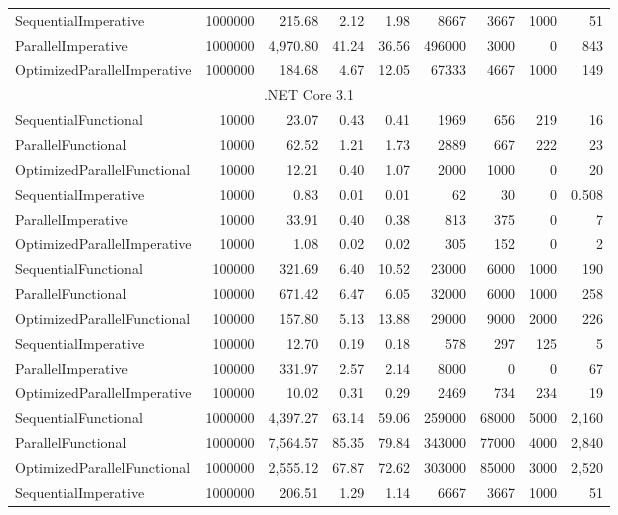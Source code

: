 \begin{table}
\begin{tabularx}{\linewidth}{Xrrrrrrrr}
SequentialImperative	&	1000000	&	215.68	&	2.12	&	1.98	&	8667	&	3667	&	1000	&	51	\\
ParallelImperative	&	1000000	&	4,970.80	&	41.24	&	36.56	&	496000	&	3000	&	0	&	843	\\
OptimizedParallelImperative	&	1000000	&	184.68	&	4.67	&	12.05	&	67333	&	4667	&	1000	&	149	\\
      \midrule
			\multicolumn{9}{c}{.NET Core 3.1} \\ 
			\midrule 
SequentialFunctional	&	10000	&	23.07	&	0.43	&	0.41	&	1969	&	656	&	219	&	16	\\
ParallelFunctional	&	10000	&	62.52	&	1.21	&	1.73	&	2889	&	667	&	222	&	23	\\
OptimizedParallelFunctional	&	10000	&	12.21	&	0.40	&	1.07	&	2000	&	1000	&	0	&	20	\\
SequentialImperative	&	10000	&	0.83	&	0.01	&	0.01	&	62	&	30	&	0	&	0.508	\\
ParallelImperative	&	10000	&	33.91	&	0.40	&	0.38	&	813	&	375	&	0	&	7	\\
OptimizedParallelImperative	&	10000	&	1.08	&	0.02	&	0.02	&	305	&	152	&	0	&	2	\\
SequentialFunctional	&	100000	&	321.69	&	6.40	&	10.52	&	23000	&	6000	&	1000	&	190	\\
ParallelFunctional	&	100000	&	671.42	&	6.47	&	6.05	&	32000	&	6000	&	1000	&	258	\\
OptimizedParallelFunctional	&	100000	&	157.80	&	5.13	&	13.88	&	29000	&	9000	&	2000	&	226	\\
SequentialImperative	&	100000	&	12.70	&	0.19	&	0.18	&	578	&	297	&	125	&	5	\\
ParallelImperative	&	100000	&	331.97	&	2.57	&	2.14	&	8000	&	0	&	0	&	67	\\
OptimizedParallelImperative	&	100000	&	10.02	&	0.31	&	0.29	&	2469	&	734	&	234	&	19	\\
SequentialFunctional	&	1000000	&	4,397.27	&	63.14	&	59.06	&	259000	&	68000	&	5000	&	2,160	\\
ParallelFunctional	&	1000000	&	7,564.57	&	85.35	&	79.84	&	343000	&	77000	&	4000	&	2,840	\\
OptimizedParallelFunctional	&	1000000	&	2,555.12	&	67.87	&	72.62	&	303000	&	85000	&	3000	&	2,520	\\
SequentialImperative	&	1000000	&	206.51	&	1.29	&	1.14	&	6667	&	3667	&	1000	&	51	\\

			\bottomrule
    \end{tabularx}
\end{table}

